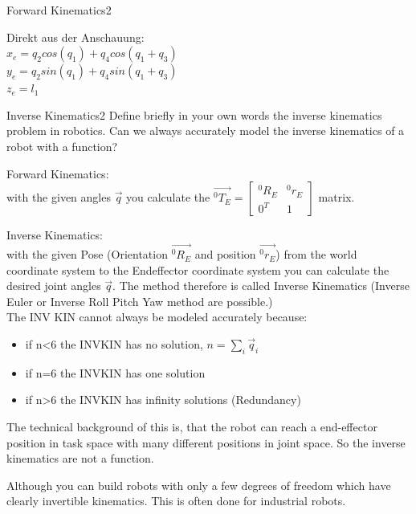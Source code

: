 \begin{questions}
\begin{question}{Forward Kinematics}{2}
\begin{answer}
	Direkt aus der Anschauung:\\
	$x_e=q_2 cos(q_1)+q_4 cos(q_1+q_3)$\\
	$y_e=q_2 sin(q_1)+q_4 sin(q_1+q_3)$\\
	$z_e=l_1$
	
	\end{answer}

\end{question}


\begin{question}{Inverse Kinematics}{2}
Define briefly in your own words the inverse kinematics problem in robotics.  
Can we always accurately model the inverse kinematics of a robot with a
function?

\begin{answer}
	Forward Kinematics: \\
	with the given angles $\vec{q}$ you calculate the $\vec{^0T_E} = \begin{bmatrix} ^0R_E & ^0r_E \\ 0^T &1\end{bmatrix}$ matrix. 
	
	Inverse Kinematics:\\
	with the given Pose (Orientation $\vec{^0R_E}$ and position $\vec{^0r_E}$) from the world coordinate system to the Endeffector coordinate system you can calculate the desired joint angles $\vec{q}$. The method therefore is called Inverse Kinematics (Inverse Euler or Inverse Roll Pitch Yaw method are possible.)\\
	
   The INV KIN cannot always be modeled accurately because:
   \begin{itemize}
   	\item if n<6  the INVKIN has no solution, $n=\sum_i \vec{q}_i$ 
   	\item if n=6  the INVKIN has one solution
   	\item if n>6  the INVKIN has infinity solutions (Redundancy)
   \end{itemize}

   The technical background of this is, that the robot can reach a end-effector position in task space with many different positions in joint space. So the inverse kinematics are not a function.

   Although you can build robots with only a few degrees of freedom which have clearly invertible kinematics. This is often done for industrial robots.
   

\end{answer}
\end{question}
\end{questions}
